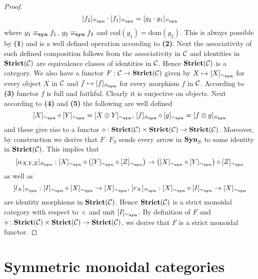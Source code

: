 \begin{proof}
$$[f_2]_{\equiv_{\mathbf{syn}}}\cdot [f_1]_{\equiv_{\mathbf{syn}}} = [g_2\cdot g_1]_{\equiv_{\mathbf{syn}}}$$
where $g_1\equiv_{\mathbf{syn}} f_1$, $g_2\equiv_{\mathbf{syn}} f_2$ and $\mathrm{cod}(g_1) = \mathrm{dom}(g_2)$. This is always possible by \textbf{(1}) and is a well defined operation according to \textbf{(2)}. Next the associativity of such defined composition follows from the associativity in ${\mathcal C}$ and identities in $\mathbf{Strict}({\mathcal C})$ are equivalence classes of identities in ${\mathcal C}$. Hence $\mathbf{Strict}({\mathcal C})$ is a category. We also have a functor $F:{\mathcal C}\rightarrow \mathbf{Strict}({\mathcal C})$ given by $X\mapsto [X]_{\sim_{\mathbf{syn}}}$ for every object $X$ in ${\mathcal C}$ and $f\mapsto [f]_{\equiv_{\mathbf{syn}}}$ for every morphism $f$ in ${\mathcal C}$. According to \textbf{(3)} functor $f$ is full and faithful. Clearly it is surjective on objects. Next according to \textbf{(4)} and \textbf{(5)} the following are well defined
$$[X]_{\sim_{\mathbf{syn}}}\diamond [Y]_{\sim_{\mathbf{syn}}} = [X\otimes Y]_{\sim_{\mathbf{syn}}},\,[f]_{\equiv_{\mathbf{syn}}}\diamond [g]_{\sim_{\mathbf{syn}}} = [f\otimes g]_{\equiv_{\mathbf{syn}}}$$
and these give rise to a functor $\diamond:\mathbf{Strict}({\mathcal C})\times \mathbf{Strict}({\mathcal C})\rightarrow \mathbf{Strict}({\mathcal C})$. Moreover, by construction we derive that $F\cdot F_S$ sends every arrow in $\mathbf{Syn}_S$ to some identity in $\mathbf{Strict}({\mathcal C})$. This implies that
$$[\alpha_{X,Y,Z}]_{\equiv_{\mathbf{syn}}}:[X]_{\sim_{\mathbf{syn}}}\diamond \left([Y]_{\sim_{\mathbf{syn}}}\diamond [Z]_{\sim_{\mathbf{syn}}}\right)\rightarrow \left([X]_{\sim_{\mathbf{syn}}}\diamond [Y]_{\sim_{\mathbf{syn}}}\right)\diamond [Z]_{\sim_{\mathbf{syn}}}$$
as well as
$$[l_X]_{\equiv_{\mathbf{syn}}}:[I]_{\sim_{\mathbf{syn}}}\diamond [X]_{\sim_{\mathbf{syn}}}\rightarrow [X]_{\sim_{\mathbf{syn}}},\,[r_X]_{\equiv_{\mathbf{syn}}}:[X]_{\sim_{\mathbf{syn}}}\diamond [I]_{\sim_{\mathbf{syn}}}\rightarrow [X]_{\sim_{\mathbf{syn}}}$$
are identity morphisms in $\mathbf{Strict}({\mathcal C})$. Hence $\mathbf{Strict}({\mathcal C})$ is a strict monoidal category with respect to $\diamond$ and unit $[I]_{\sim_{\mathbf{syn}}}$. By definition of $F$ and $\diamond:\mathbf{Strict}({\mathcal C})\times \mathbf{Strict}({\mathcal C})\rightarrow \mathbf{Strict}({\mathcal C})$, we derive that $F$ is a strict monoidal functor.
\end{proof}

\section{Symmetric monoidal categories}

